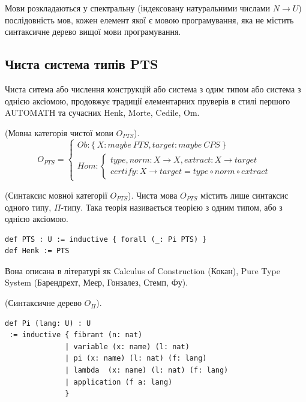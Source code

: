 Мови розкладаються у спектральну (індексовану натуральними числами $N \rightarrow U$)
послідовність мов, кожен елемент якої є мовою програмування,
яка не містить синтаксичне дерево вищої мови програмування.

\newpage
\subsection{Чиста система типів PTS}
Чиста ситема або числення конструкцій або система з одим типом або
система з однією аксіомою, продовжує традиції елементарних пруверів
в стилі першого AUTOMATH та сучасних Henk, Morte, Cedile, Om.

\begin{definition} (Мовна категорія чистої мови $O_{PTS}$).
\begin{equation}
O_{PTS} =
\begin{cases}
Ob: \{\ X: maybe\ PTS, target: maybe\ CPS \ \} \\
Hom: \begin{cases}
type,norm: X \rightarrow X, extract: X \rightarrow target \\
certify: X \rightarrow target = type \circ norm \circ extract
\end{cases}
\end{cases}
\end{equation}
\end{definition}

\begin{definition} (Синтаксис мовної категорії $O_{PTS}$).
Чиста мова $O_{PTS}$ містить лише синтаксис одного типу, $\Pi$-типу.
Така теорія називається теорією з одним типом, або з однією аксіомою.
\begin{lstlisting}
def PTS : U := inductive { forall (_: Pi PTS) }
def Henk := PTS
\end{lstlisting}
\end{definition}

Вона описана в літературі як Calculus of Construction (Кокан),
Pure Type System (Барендрехт, Меєр, Гонзалез, Стемп, Фу).

\begin{definition} (Синтаксичне дерево $O_\Pi$).
\begin{lstlisting}[mathescape=true]
def Pi (lang: U) : U
 := inductive { fibrant (n: nat)
              | variable (x: name) (l: nat)
              | pi (x: name) (l: nat) (f: lang)
              | lambda  (x: name) (l: nat) (f: lang)
              | application (f a: lang)
              }
\end{lstlisting}
\end{definition}

